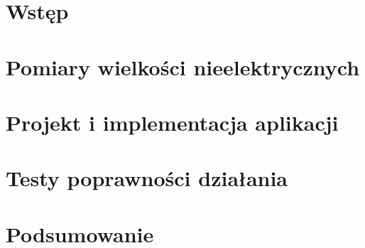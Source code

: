 \chapter{Wstęp}


\chapter{Pomiary wielkości nieelektrycznych}\label{sect:sensor-theory}


\chapter{Projekt i implementacja aplikacji}\label{sect:app}


\chapter{Testy poprawności działania}\label{sect:tests}


\chapter{Podsumowanie}\label{sect:summary}

